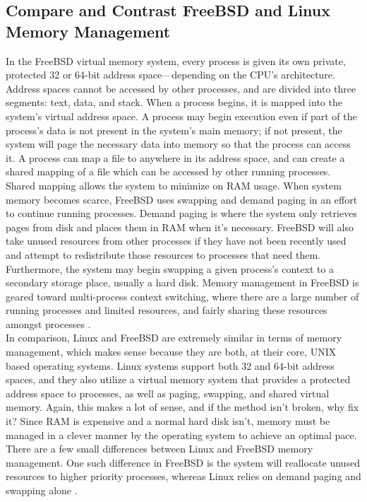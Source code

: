 \documentclass[onecolumn, draftclsnofoot,10pt, compsoc]{IEEEtran}
\begin{document}
\subsection{Compare and Contrast FreeBSD and Linux Memory Management}
\noindent In the FreeBSD virtual memory system, every process is given its own private, protected 32 or 64-bit address space–--depending on the CPU’s architecture. Address spaces cannot be accessed by other processes, and are divided into three segments: text, data, and stack. When a process begins, it is mapped into the system’s virtual address space. A process may begin execution even if part of the process’s data is not present in the system’s main memory; if not present, the system will page the necessary data into memory so that the process can access it. A process can map a file to anywhere in its address space, and can create a shared mapping of a file which can be accessed by other running processes. Shared mapping allows the system to minimize on RAM usage. When system memory becomes scarce, FreeBSD uses swapping and demand paging in an effort to continue running processes. Demand paging is where the system only retrieves pages from disk and places them in RAM when it’s necessary. FreeBSD will also take unused resources from other processes if they have not been recently used and attempt to redistribute those resources to processes that need them. Furthermore, the system may begin swapping a given process’s context to a secondary storage place, usually a hard disk. Memory management in FreeBSD is geared toward multi-process context switching, where there are a large number of running processes and limited resources, and fairly sharing these resources amongst processes \cite{FreeBSD1Mem} \cite{FreeBSD2Mem}.\\

\noindent In comparison, Linux and FreeBSD are extremely similar in terms of memory management, which makes sense because they are both, at their core, UNIX based operating systems. Linux systems support both 32 and 64-bit address spaces, and they also utilize a virtual memory system that provides a protected address space to processes, as well as paging, swapping, and shared virtual memory. Again, this makes a lot of sense, and if the method isn’t broken, why fix it? Since RAM is expensive and a normal hard disk isn’t, memory must be managed in a clever manner by the operating system to achieve an optimal pace. There are a few small differences between Linux and FreeBSD memory management. One such difference in FreeBSD is the system will reallocate unused resources to higher priority processes, whereas Linux relies on demand paging and swapping alone \cite{Linux1Mem} \cite{Linux}.\\
\end{document}
